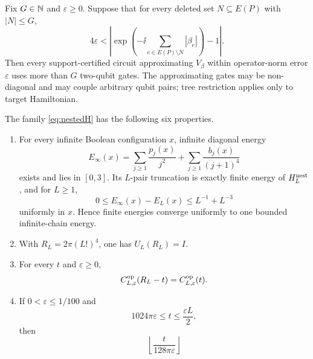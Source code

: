 \begin{theorem}
\label{thm:phasetail}
Fix $G\in\mathbb N$ and $\varepsilon\ge0$.  Suppose that for every deleted set
$N\subseteq E(P)$ with $|N|\le G$,
\begin{equation}
 4\varepsilon<
 \left|\exp\!\left(-\ii\sum_{e\in E(P)\setminus N}|\beta_e|\right)-1\right|.
 \label{eq:phasetail}
\end{equation}
Then every support-certified circuit approximating $V_\beta$ within
operator-norm error $\varepsilon$ uses more than $G$ two-qubit gates.  The
approximating gates may be non-diagonal and may couple arbitrary qubit pairs;
tree restriction applies only to target Hamiltonian.
\end{theorem}

\begin{theorem}
\label{thm:nestedramp}
The family \eqref{eq:nestedH} has the following six properties.
\begin{enumerate}[leftmargin=1.7em]
\item For every infinite Boolean configuration $x$, infinite diagonal energy
\begin{equation}
 E_\infty(x)=\sum_{j\ge1}\frac{p_j(x)}{j^2}
 +\sum_{j\ge1}\frac{b_j(x)}{(j+1)^4}                 \label{eq:nestedenergy}
\end{equation}
exists and lies in $[0,3]$.  Its $L$-pair truncation is exactly finite energy
of $H_L^{\rm nest}$, and for $L\ge1$,
\begin{equation}
 0\le E_\infty(x)-E_L(x)\le L^{-1}+L^{-3}             \label{eq:nestedtail}
\end{equation}
uniformly in $x$.  Hence finite energies converge uniformly to one bounded
infinite-chain energy.
\item With $R_L=2\pi(L!)^4$, one has $U_L(R_L)=I$.
\item For every $t$ and $\varepsilon\ge0$,
\begin{equation}
 C^{\rm op}_{L,\varepsilon}(R_L-t)
 =C^{\rm op}_{L,\varepsilon}(t).                     \label{eq:nestedreflection}
\end{equation}
\item If $0<\varepsilon\le1/100$ and
\begin{equation}
 1024\pi\varepsilon\le t\le\frac{\varepsilon L}{2}, \label{eq:nestedwindow}
\end{equation}
then
\begin{equation}
 \left\lfloor\frac{t}{128\pi\varepsilon}\right\rfloor

\end{equation}
\end{enumerate}
\end{theorem}
